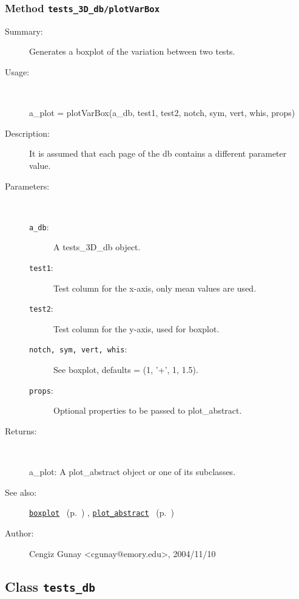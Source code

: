 \subsubsection[Method \texttt{plotVarBox}]{Method \texttt{tests\_3D\_db/plotVarBox}}%
%
\label{ref_tests_3D_db__plotVarBox}%
\hypertarget{ref_tests_3D_db__plotVarBox}{}%
\begin{description}
\item[Summary:]Generates a boxplot of the variation between two tests.
%
\item[Usage:]~%
\begin{lyxcode}%
a\_plot = plotVarBox(a\_db, test1, test2, notch, sym, vert, whis, props)
%
\end{lyxcode}%
%
\item[Description:]%
It is assumed that each page of the db contains a different parameter value.
\item[Parameters:]~
\begin{description}%
\item[\texttt{a\_db}:]
 A tests\_3D\_db object.
\item[\texttt{test1}:]
 Test column for the x-axis, only mean values are used.
\item[\texttt{test2}:]
 Test column for the y-axis, used for boxplot.
\item[\texttt{notch, sym, vert, whis}:]
 See boxplot, defaults = (1, '+', 1, 1.5).
\item[\texttt{props}:]
 Optional properties to be passed to plot\_abstract.
\end{description}%
%
\item[Returns:]~

	a\_plot: A plot\_abstract object or one of its subclasses.
%
%
\item[See also:]%
\hyperlink{ref_boxplot}{\texttt{boxplot}}%
\ (p.~\pageref{ref_boxplot})%
%
, \hyperlink{ref_plot_abstract}{\texttt{plot\_abstract}}%
\ (p.~\pageref{ref_plot_abstract})%
%
%
\item[Author:]%
Cengiz Gunay <cgunay@emory.edu>, 2004/11/10%
\end{description}
\methodline%
\subsection{Class \texttt{tests\_db}}%
%
\label{ref_tests_db}%
\hypertarget{ref_tests_db}{}%
